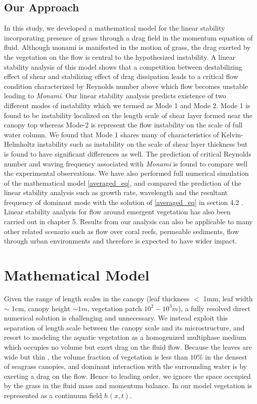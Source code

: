 \documentclass[12pt]{report}   %
\begin{document}
\section{Our Approach}
In this study, we developed a mathematical model for the linear stability incorporating presence of grass through a drag field in the momentum equation of fluid. Although monami is manifested in the motion of grass, the drag exerted by the vegetation on the flow is central to the hypothesized instability. A linear stability analysis of this model shows that a competition between destabilizing effect of shear and stabilizing effect of drag dissipation leads to a critical flow condition characterized by Reynolds number above which flow becomes unstable leading to \textit{Monami}. Our linear stability analysis predicts existence of two different modes of instability which we termed as Mode 1 and Mode 2. Mode 1 is found to be instability localized on the length scale of shear layer formed near the canopy top whereas Mode-2 is represent the flow instability on the scale of full water column. We found that Mode 1 shares many of characteristics of Kelvin-Helmholtz instability such as instability on the scale of 
shear layer thickness but is found to have significant differences as well. The prediction of critical Reynolds number and waving frequency associated with \textit{Monami} is found to compare well the experimental observations. We have also performed full numerical simulation of the mathematical model \eqref{averaged_eq}, and compared the prediction of the linear stability analysis such as growth rate, wavelength and the resultant frequency of dominant mode with the solution of \eqref{averaged_eq} in section 4.2 . Linear stability analysis for flow around emergent vegetation has also been carried out in chapter 5. Results from our analysis can also be applicable to many other related scenario such as flow over coral reefs, permeable sediments, flow through urban environments and therefore is expected to have wider impact. 

%
\clearpage{\pagestyle{empty}\cleardoublepage}

\chapter{Mathematical Model}
Given the range of length scales in the canopy (leaf thickness $<$ 1mm, leaf width $\sim$ 1cm, canopy height $\sim 1m$, vegetation patch $10^2-10^3 m$), a fully resolved direct numerical solution is challenging and unnecessary. We instead exploit this separation of length scale between the canopy scale and its microstructure, and resort to modeling the aquatic vegetation as a homogenized multiphase medium which occupies no volume but exert drag on the fluid flow.
Because the leaves are wide but thin , the volume fraction of vegetation is less than $10\%$ \cite{chandler96} in the densest of seagrass canopies, and dominant interaction with the surrounding water is by exerting a drag on the flow. Hence to leading order, we ignore the space occupied by the grass in the fluid mass and momentum balance. In our model vegetation is represented as a continuum field $h(x,t)$. 
\end{document}

